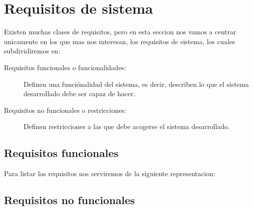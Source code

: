 \chapter{Requisitos de sistema}

    Existen muchas clases de requisitos, pero en esta seccion nos vamos a centrar unicamente en los que mas nos interesan, los requisitos de sistema, los cuales subdividiremos en:
    \begin{description}
        \item[Requisitos funcionales o funcionalidades:]
            Definen una funciónalidad del sistema, es decir, describen lo que el sistema desarrollado debe ser capaz de hacer.
        \item[Requisitos no funcionales o restricciones:]
            Definen restricciones a las que debe acogerse el sistema desarrollado.
  
    \end{description}
  

\section{Requisitos funcionales}
    Para listar los requisitos nos serviremos de la siguiente representacion:
    

\section{Requisitos no funcionales}
    

%    
